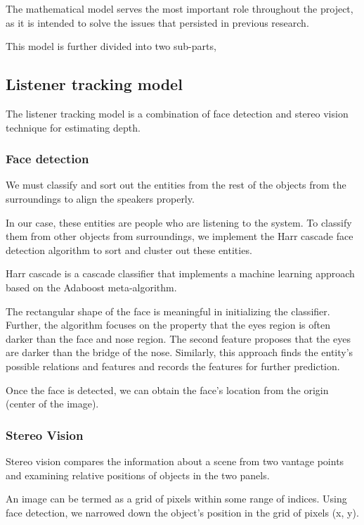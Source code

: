 \documentclass[twocolumn]{report}
\begin{document}
The mathematical model serves the most important role throughout the project, as it is 
intended to solve the issues that persisted in previous research. 

This model is further divided into two sub-parts,

\subsection{Listener tracking model}

The listener tracking model is a combination of face detection and stereo vision 
technique for estimating depth.

\subsubsection{Face detection}

We must classify and sort out the entities from the rest of the objects from the 
surroundings to align the speakers properly.

In our case, these entities are people who are listening to the system. To classify 
them from other objects from surroundings, we implement the Harr cascade face detection 
algorithm to sort and cluster out these entities.

Harr cascade is a cascade classifier that implements a machine learning approach based 
on the Adaboost meta-algorithm.

The rectangular shape of the face is meaningful in initializing the classifier. Further, 
the algorithm focuses on the property that the eyes region is often darker than the face 
and nose region. The second feature proposes that the eyes are darker than the bridge of 
the nose. Similarly, this approach finds the entity's possible relations and features 
and records the features for further prediction. 

Once the face is detected, we can obtain the face's location from the origin (center of 
the image).

\subsubsection{Stereo Vision}

Stereo vision compares the information about a scene from two vantage points and 
examining relative positions of objects in the two panels.

An image can be termed as a grid of pixels within some range of indices. Using face 
detection, we narrowed down the object's position in the grid of pixels (x, y). 
\end{document}
